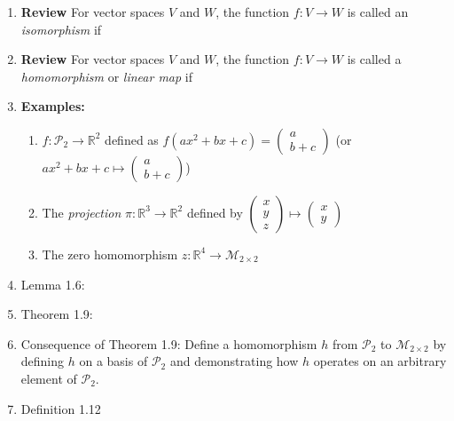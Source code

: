 \documentclass[11pt,fleqn]{article}
\begin{document}
\renewcommand{\headrulewidth}{0pt}
\newcommand{\blank}[1]{\rule{#1}{0.75pt}}
\renewcommand{\d}{\displaystyle}

\newcommand{\bpm}{\begin{pmatrix}}
\newcommand{\epm}{\end{pmatrix}}

\vspace*{-0.7in}

\begin{center}
  \large {}
\end{center}
\begin{enumerate}
\item \textbf{Review} For vector spaces $V$ and $W$, the function $f:V \to W$ is called an \emph{isomorphism} if 
\vfill
\item \textbf{Review} For vector spaces $V$ and $W$, the function $f:V \to W$ is called a \emph{homomorphism} or \emph{linear map} if
\vfill

\item \textbf{Examples:}
	\begin{enumerate}
	\item $f: \mathcal{P}_2 \to \mathbb{R}^2$ defined as  $f(ax^2+bx+c)=\bpm a \\ b+c \epm$ (or $ax^2+bx+c \mapsto \bpm a \\ b+c \epm$)
	\vspace{2in}
	\item The \emph{projection} $\pi: \mathbb{R}^3 \to \mathbb{R}^2$ defined by $\bpm x \\ y \\ z \epm \mapsto \bpm x \\ y \epm$
	\vspace{2in}
	\item The zero homomorphism $z: \mathbb{R}^4 \to \mathcal{M}_{2 \times 2}$
	\vfill
	\end{enumerate}
\newpage
\item Lemma 1.6: \\
\vspace{.5in}
\item Theorem 1.9:\\
\vspace{1in}
\item Consequence of Theorem 1.9: Define a homomorphism $h$ from $\mathcal{P}_2$ to $\mathcal{M}_{2 \times 2}$ by defining $h$ on a basis of $\mathcal{P}_2$ and demonstrating how $h$ operates on an arbitrary element of $\mathcal{P}_2$.
\vfill
\item Definition 1.12\\
\vfill
\end{enumerate}
\end{document}
